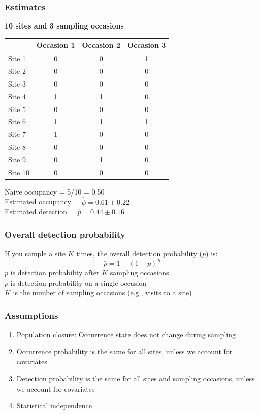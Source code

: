 \documentclass[color=usenames,dvipsnames]{beamer}\usepackage[]{graphicx}\usepackage[]{color}
\begin{document}
\begin{frame}
  \frametitle{Estimates}
  {\bf \centering \large 10 sites and 3 sampling occasions \par}
  \vspace{0.3cm}
  \begin{center}
    \small
    \begin{tabular}{lccc}
      \hline
      & Occasion 1 & Occasion 2 & Occasion 3 \\
      \hline
      Site 1 & 0 & 0 & 1 \\
      Site 2 & 0 & 0 & 0 \\
      Site 3 & 0 & 0 & 0 \\
      Site 4 & 1 & 1 & 0 \\
      Site 5 & 0 & 0 & 0 \\
      Site 6 & 1 & 1 & 1 \\
      Site 7 & 1 & 0 & 0 \\
      Site 8 & 0 & 0 & 0 \\
      Site 9 & 0 & 1 & 0 \\
      Site 10 & 0 & 0 & 0 \\
      \hline
    \end{tabular}
  \end{center}
  Naive occupancy = 5/10 = 0.50 \\
  Estimated occupancy = $\hat{\psi} = 0.61 \pm 0.22$ \\
  Estimated detection = $\hat{p} = 0.44 \pm 0.16$ \\
\end{frame}




\begin{frame}
  \frametitle{Overall detection probability}
  \Large
  {\centering If you sample a site $K$ times, the overall detection
    probability ($\bar{p}$) is:}
  \[
    \bar{p} = 1 - (1-p)^K
  \]
  \vfill
  \large
  $\bar{p}$ is detection probability after $K$ sampling occasions \\
  $p$ is detection probability on a single occasion \\
  $K$ is the number of sampling occasions (e.g., visits to a site)
\end{frame}









\begin{frame}
  \frametitle{Assumptions}
  \large
  \begin{enumerate}[<+- | visible@+->][\bf \color{PineGreen} (1)]
    \item Population closure: Occurrence state does not change during sampling
    \item Occurrence probability is the same for all sites, unless we
      account for \alert{covariates}
    \item Detection probability is the same for all sites and sampling
      occasions, unless we account for covariates
    \item Statistical independence
  \end{enumerate}
\end{frame}
\end{document}
